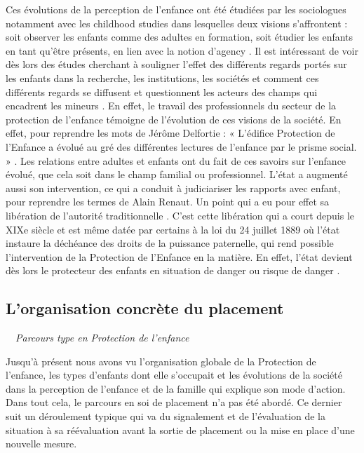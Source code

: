\documentclass[
  12,
  a4paper,
]{report}
\begin{document}
Ces évolutions de la perception de l'enfance ont été étudiées par les
sociologues notamment avec les childhood studies dans lesquelles deux
visions s'affrontent : soit observer les enfants comme des adultes en
formation, soit étudier les enfants en tant qu'être présents, en lien
avec la notion d'agency . Il est intéressant de voir dès lors des études
cherchant à souligner l'effet des différents regards portés sur les
enfants dans la recherche, les institutions, les sociétés et comment ces
différents regards se diffusent et questionnent les acteurs des champs
qui encadrent les mineurs . En effet, le travail des professionnels du
secteur de la protection de l'enfance témoigne de l'évolution de ces
visions de la société. En effet, pour reprendre les mots de Jérôme
Delfortie : « L'édifice Protection de l'Enfance a évolué au gré des
différentes lectures de l'enfance par le prisme social. » . Les
relations entre adultes et enfants ont du fait de ces savoirs sur
l'enfance évolué, que cela soit dans le champ familial ou professionnel.
L'état a augmenté aussi son intervention, ce qui a conduit à
judiciariser les rapports avec enfant, pour reprendre les termes de
Alain Renaut. Un point qui a eu pour effet sa libération de l'autorité
traditionnelle . C'est cette libération qui a court depuis le XIXe
siècle et est même datée par certains à la loi du 24 juillet 1889 où
l'état instaure la déchéance des droits de la puissance paternelle, qui
rend possible l'intervention de la Protection de l'Enfance en la
matière. En effet, l'état devient dès lors le protecteur des enfants en
situation de danger ou risque de danger .

\hypertarget{lorganisation-concruxe8te-du-placement}{%
\subsection{L'organisation concrète du
placement}\label{lorganisation-concruxe8te-du-placement}}

~~\emph{Parcours type en Protection de l'enfance}

Jusqu'à présent nous avons vu l'organisation globale de la Protection de
l'enfance, les types d'enfants dont elle s'occupait et les évolutions de
la société dans la perception de l'enfance et de la famille qui explique
son mode d'action. Dans tout cela, le parcours en soi de placement n'a
pas été abordé. Ce dernier suit un déroulement typique qui va du
signalement et de l'évaluation de la situation à sa réévaluation avant
la sortie de placement ou la mise en place d'une nouvelle mesure.
\end{document}
